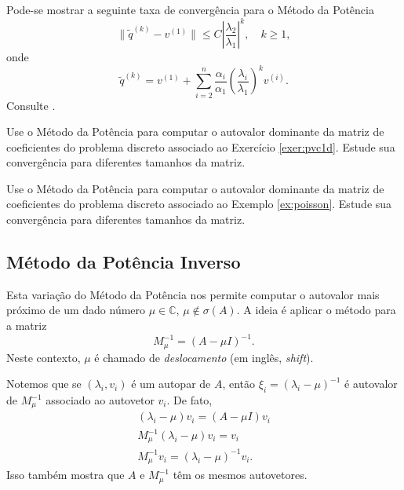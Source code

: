 \begin{obs}
  Pode-se mostrar a seguinte taxa de convergência para o Método da Potência
  \begin{equation}
    \|\tilde{q}^{(k)}-v^{(1)}\| \leq C\left|\frac{\lambda_2}{\lambda_1}\right|^k,\quad k\geq 1,
  \end{equation}
  onde
  \begin{equation}
    \tilde{q}^{(k)} = v^{(1)} + \sum_{i=2}^n \frac{\alpha_i}{\alpha_1}\left(\frac{\lambda_i}{\lambda_1}\right)^kv^{(i)}.
  \end{equation}
  Consulte \cite[Seção 5.3.]{Quarteroni2007}.
\end{obs}



\begin{exer}
  Use o Método da Potência para computar o autovalor dominante da matriz de coeficientes do problema discreto associado ao Exercício \ref{exer:pvc1d}. Estude sua convergência para diferentes tamanhos da matriz. 
\end{exer}

\begin{exer}
  Use o Método da Potência para computar o autovalor dominante da matriz de coeficientes do problema discreto associado ao Exemplo \ref{ex:poisson}. Estude sua convergência para diferentes tamanhos da matriz. 
\end{exer}

\subsection{Método da Potência Inverso}

Esta variação do Método da Potência nos permite computar o autovalor mais próximo de um dado número $\mu\in\mathbb{C}$, $\mu\not\in\sigma(A)$. A ideia é aplicar o método para a matriz
\begin{equation}
  M_\mu^{-1} = (A-\mu I)^{-1}.
\end{equation}
Neste contexto, $\mu$ é chamado de \emph{deslocamento} (em inglês, {\it shift}).

Notemos que se $(\lambda_i, v_i)$ é um autopar de $A$, então $\xi_i=(\lambda_i-\mu)^{-1}$ é autovalor de $M_\mu^{-1}$ associado ao autovetor $v_i$. De fato,
\begin{gather}
  (\lambda_i - \mu) v_i = (A-\mu I)v_i\\
  M_\mu^{-1}(\lambda_i-\mu)v_i = v_i\\
  M_\mu^{-1}v_i = (\lambda_i-\mu)^{-1}v_i.
\end{gather}
Isso também mostra que $A$ e $M_\mu^{-1}$ têm os mesmos autovetores.

